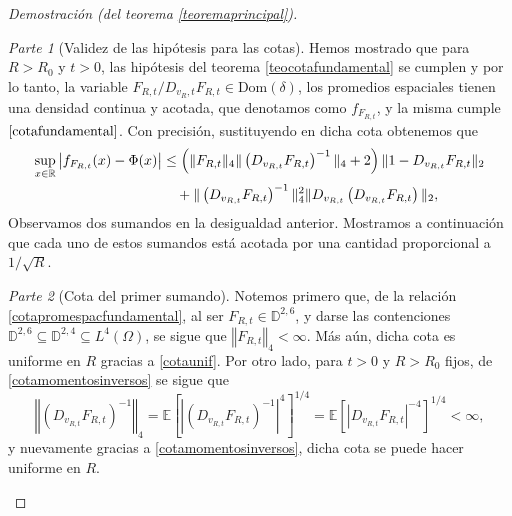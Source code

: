 \documentclass[letterpaper,twoside,12pt]{book}
\newcommand{\R}{\mathbb{R}}
\newcommand{\D}{\mathbb{D}}
\newcommand{\E}{\mathbb{E}}
\newcommand{\1}{\mathds{1}}
\newcommand{\abs}[1]{\left\lvert #1 \right\rvert}
\newcommand{\norm}[1]{\left\Vert #1 \right\Vert}
\theoremstyle{definition}
\theoremstyle{definition}
\theoremstyle{remark}
\newtheorem{proofpart}{Parte}
\theoremstyle{definition}
\theoremstyle{definition}
\theoremstyle{definition}
\theoremstyle{definition}
\theoremstyle{definition}
\begin{document}
\begin{proof}[Demostración (del teorema \ref{teoremaprincipal})]
\begin{proofpart}[Validez de las hipótesis para las cotas]
Hemos mostrado que para $R>R_0$ y $t>0$, las hipótesis del teorema \ref{teocotafundamental} se cumplen y por lo tanto, la variable $F_{R,t}/D_{v_R,t}F_{R,t}\in \text{Dom}(\delta)$, los promedios espaciales tienen una densidad continua y acotada, que denotamos como $f_{F_{R,t}}$, y la misma cumple  $\eqref{cotafundamental}$. Con precisión, sustituyendo en dicha cota obtenemos que 
\begin{align}\label{cotapromespacfundamental}
   \sup_{x\in \R} \abs{f_{F_{R,t}}(x)-\Phi(x)}&\leq \left(\|F_{R,t}\|_4\|\left(D_{v_{R,t}}F_{R,t}\right)^{-1}\|_4+2\right)\|1-D_{v_{R,t}}F_{R,t}\|_2\notag\\
   &\ \ \ +\|\left(D_{v_{R,t}}F_{R,t}\right)^{-1}\|^{2}_4\|D_{v_{R,t}} \left(D_{v_{R,t}}F_{R,t}\right)\|_2,
\end{align}
Observamos dos sumandos en la desigualdad anterior. Mostramos a continuación que cada uno de estos sumandos está acotada por una cantidad proporcional a $1/\sqrt{R}$.
\end{proofpart}
\begin{proofpart}[Cota del primer sumando]
Notemos primero que, de la relación \eqref{cotapromespacfundamental}, al ser $F_{R,t}\in \D^{2,6}$, y darse las contenciones $\D^{2,6}\subseteq \D^{2,4}\subseteq{L^{4}}(\Omega)$, se sigue que $\norm{F_{R,t}}_4<\infty$. Más aún, dicha cota es uniforme en $R$ gracias a \ref{cotaunif}. Por otro lado, para $t>0$ y $R>R_0$ fijos, de \eqref{cotamomentosinversos} se sigue que 
\begin{equation}\label{cotapromespacmomentosinversos}
   \norm{(D_{v_{R,t}}F_{R,t})^{-1}}_4=\E\left[\abs{\left(D_{v_{R,t}}F_{R,t}\right)^{-1}}^{4}\right]^{1/4}=\E\left[\abs{D_{v_{R,t}}F_{R,t}}^{-4}\right]^{1/4}<\infty,
\end{equation}
y nuevamente gracias a \ref{cotamomentosinversos}, dicha cota se puede hacer uniforme en $R$. 


\end{proofpart}
\end{proof}
\end{document}
